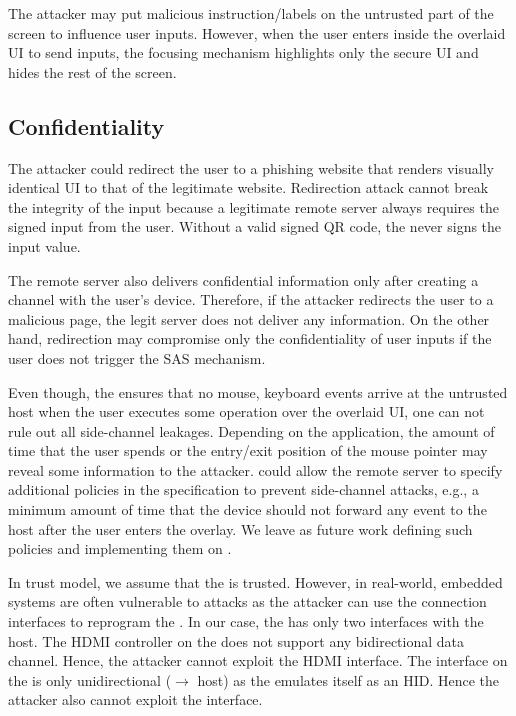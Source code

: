  The attacker may put malicious instruction/labels on the untrusted part of the screen to influence user inputs. However, when the user enters inside the overlaid UI to send inputs, the focusing mechanism highlights only the secure UI and hides the rest of the screen. 

\subsection{Confidentiality}

 The attacker could redirect the user to a phishing website that renders visually identical UI to that of the legitimate website. Redirection attack cannot break the integrity of the input because a legitimate remote server always requires the signed input from the user. Without a valid signed QR code, the \device never signs the input value. 

The remote server also delivers confidential information only after creating a \tls channel with the user's device. Therefore, if the attacker redirects the user to a malicious page, the legit server does not deliver any information. On the other hand, redirection may compromise only the confidentiality of user inputs if the user does not trigger the SAS mechanism. 

 Even though, the \device ensures that no mouse, keyboard events arrive at the untrusted host when the user executes some operation over the overlaid UI, one can not rule out all side-channel leakages. Depending on the application, the amount of time that the user spends or the entry/exit position of the mouse pointer may reveal some information to the attacker. 
\device could allow the remote server to specify additional policies in the specification to prevent side-channel attacks, e.g., a minimum amount of time that the device should not forward any event to the host after the user enters the overlay. We leave as future work defining such policies and implementing them on \name.


 In \name trust model, we assume that the \device is trusted. However, in real-world, embedded systems are often vulnerable to attacks as the attacker can use the connection interfaces to reprogram the \device. In our case, the \device has only two interfaces with the host. The HDMI controller on the \device does not support any bidirectional data channel. Hence, the attacker cannot exploit the HDMI interface. The \usb interface on the \device is only unidirectional (\device $\rightarrow$ host) as the \device emulates itself as an HID. Hence the attacker also cannot exploit the \usb interface.  
